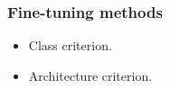 \documentclass[14pt,aspectratio=169]{beamer}
\begin{document}
%
%
%
%

\begin{frame}
\frametitle{Fine-tuning methods}
\begin{itemize}
  \item Class criterion.
  \item Architecture criterion.
\end{itemize}
\end{frame}
\end{document}
